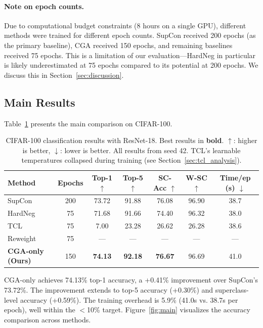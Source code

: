 \documentclass{article}
\begin{document}
\paragraph{Note on epoch counts.} Due to computational budget constraints (8 hours on a single GPU), different methods were trained for different epoch counts. SupCon received 200 epochs (as the primary baseline), CGA received 150 epochs, and remaining baselines received 75 epochs. This is a limitation of our evaluation---HardNeg in particular is likely underestimated at 75 epochs compared to its potential at 200 epochs. We discuss this in Section~\ref{sec:discussion}.

\subsection{Main Results}

Table~\ref{tab:main} presents the main comparison on CIFAR-100.

\begin{table}[t]
\caption{CIFAR-100 classification results with ResNet-18. Best results in \textbf{bold}. $\uparrow$: higher is better, $\downarrow$: lower is better. All results from seed 42. TCL's learnable temperatures collapsed during training (see Section~\ref{sec:tcl_analysis}).}
\label{tab:main}
\centering
\small
\begin{tabular}{lcccccc}
\toprule
Method & Epochs & Top-1 $\uparrow$ & Top-5 $\uparrow$ & SC-Acc $\uparrow$ & W-SC $\uparrow$ & Time/ep (s) $\downarrow$ \\
\midrule
SupCon & 200 & 73.72 & 91.88 & 76.08 & 96.90 & 38.7 \\
HardNeg & 75 & 71.68 & 91.66 & 74.40 & 96.32 & 38.0 \\
TCL & 75 & 7.00 & 23.28 & 26.62 & 26.28 & 38.6 \\
Reweight & 75 & --- & --- & --- & --- & --- \\
\midrule
\textbf{CGA-only (Ours)} & 150 & \textbf{74.13} & \textbf{92.18} & \textbf{76.67} & 96.69 & 41.0 \\
\bottomrule
\end{tabular}
\end{table}

CGA-only achieves 74.13\% top-1 accuracy, a +0.41\% improvement over SupCon's 73.72\%. The improvement extends to top-5 accuracy (+0.30\%) and superclass-level accuracy (+0.59\%). The training overhead is 5.9\% (41.0s vs. 38.7s per epoch), well within the $<$10\% target. Figure~\ref{fig:main} visualizes the accuracy comparison across methods.
\end{document}
